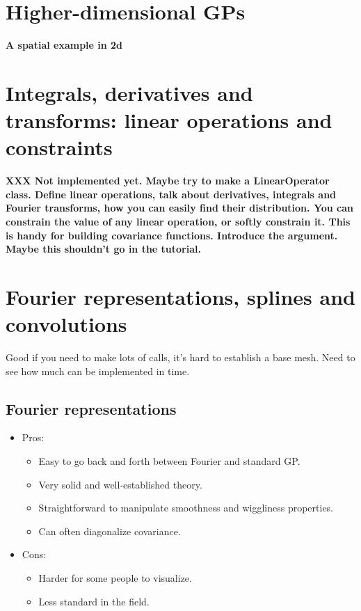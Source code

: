 \documentclass{manual}
\begin{document}
\section{Higher-dimensional GPs}\label{sec:highdim} %
\textbf{A spatial example in 2d}

\section{Integrals, derivatives and transforms: linear operations and constraints}\label{sec:linop} %

\textbf{XXX Not implemented yet. Maybe try to make a LinearOperator class. Define linear operations, talk about derivatives, integrals and Fourier transforms, how you can easily find their distribution. You can constrain the value of any linear operation, or softly constrain it. This is handy for building covariance functions. Introduce the  argument. Maybe this shouldn't go in the tutorial.}


\section{Fourier representations, splines and convolutions}\label{sec:approx} %
Good if you need to make lots of calls, it's hard to establish a base mesh. Need to see how much can be implemented in time.

\subsection{Fourier representations}\label{sub:fourier}
\begin{itemize}
	\item Pros:
	\begin{itemize}
		\item Easy to go back and forth between Fourier and standard GP.
		\item Very solid and well-established theory.
		\item Straightforward to manipulate smoothness and wiggliness properties.
		\item Can often diagonalize covariance.
	\end{itemize}
	\item Cons:
	\begin{itemize}
		\item Harder for some people to visualize.
		\item Less standard in the field.
	\end{itemize}
\end{itemize}
\end{document}
